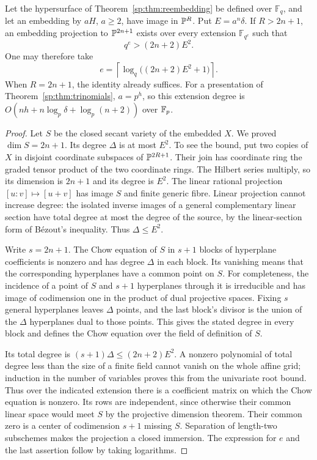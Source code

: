 \begin{proposition}
\label{sp:prop:projection-field}
Let the hypersurface of Theorem~\ref{sp:thm:reembedding} be defined over
$\mathbb F_q$, and let an embedding by $aH$, $a\geq2$, have image in
$\mathbb P^R$. Put $E=a^n\delta$. If $R>2n+1$, an embedding projection to
$\mathbb P^{2n+1}$ exists over every extension $\mathbb F_{q^e}$ such that
\[
 q^e>(2n+2)E^2.
\]
One may therefore take
\[
 e=\left\lceil\log_q\bigl((2n+2)E^2+1\bigr)\right\rceil.
\]
When $R=2n+1$, the identity already suffices. For a presentation of
Theorem~\ref{sp:thm:trinomials}, $a=p^h$, so this extension degree is
$O(nh+n\log_p\delta+\log_p(n+2))$ over $\mathbb F_p$.
\end{proposition}
\begin{proof}
Let $S$ be the closed secant variety of the embedded $X$. We proved
$\dim S=2n+1$. Its degree $\Delta$ is at most $E^2$.
To see the bound, put two copies of $X$ in disjoint coordinate subspaces
of $\mathbb P^{2R+1}$. Their join has coordinate ring the graded tensor
product of the two coordinate rings. The Hilbert series multiply, so
its dimension is $2n+1$ and its degree is $E^2$. The linear rational
projection $[u:v]\mapsto[u+v]$ has image $S$ and finite generic fibre.
Linear projection cannot increase degree: the isolated inverse images
of a general complementary linear section have total degree at most
the degree of the source, by the linear-section form of B\'ezout's
inequality. Thus $\Delta\leq E^2$.

Write $s=2n+1$. The Chow equation of $S$ in $s+1$ blocks of hyperplane
coefficients is nonzero and has degree $\Delta$ in each block. Its
vanishing means that the corresponding hyperplanes have a common
point on $S$. For completeness, the incidence of a point of $S$ and
$s+1$ hyperplanes through it is irreducible and has image of codimension
one in the product of dual projective spaces. Fixing $s$ general
hyperplanes leaves $\Delta$ points, and the last block's divisor is
the union of the $\Delta$ hyperplanes dual to those points. This gives
the stated degree in every block and defines the Chow equation over
the field of definition of $S$.

Its total degree is $(s+1)\Delta\leq(2n+2)E^2$. A nonzero polynomial
of total degree less than the size of a finite field cannot vanish
on the whole affine grid; induction in the number of variables proves
this from the univariate root bound. Thus over the indicated extension
there is a coefficient matrix on which the Chow equation is nonzero.
Its rows are independent, since otherwise their common linear space
would meet $S$ by the projective dimension theorem. Their common zero
is a center of codimension $s+1$ missing $S$. Separation of length-two
subschemes makes the projection a closed immersion. The expression for
$e$ and the last assertion follow by taking logarithms.
\end{proof}

